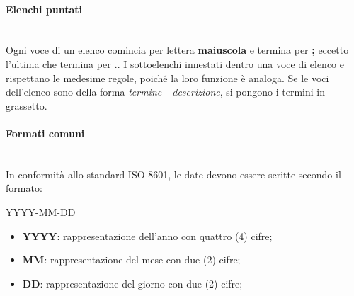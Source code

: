 		\paragraph{Elenchi puntati} \mbox{}\\
		Ogni voce di un elenco comincia per lettera \textbf{maiuscola} e termina per \textbf{;} eccetto l'ultima che termina per \textbf{.}. I sottoelenchi innestati dentro una voce di elenco e rispettano le medesime regole, poiché la loro funzione è analoga.\newline
		Se le voci dell'elenco sono della forma \textit{termine - descrizione}, si pongono i termini in grassetto.
		\paragraph{Formati comuni} \mbox{}\\
		In conformità allo standard ISO 8601, le date devono essere scritte secondo il formato: \newline
		\centerline{YYYY-MM-DD}
		\begin{itemize}
			\item \textbf{YYYY}: rappresentazione dell'anno con quattro (4) cifre;
			\item\textbf{MM}: rappresentazione del mese con due (2) cifre;
			\item \textbf{DD}: rappresentazione del giorno con due (2) cifre;			
		\end{itemize}
